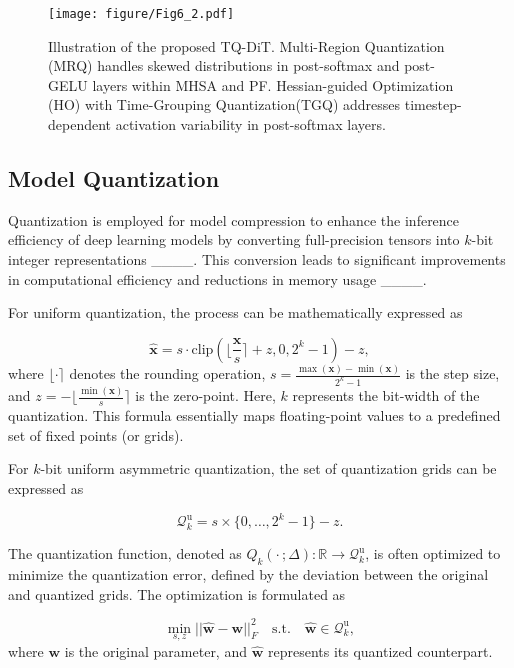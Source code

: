 \begin{figure*}
    \centering
    \texttt{[image: figure/Fig6\_2.pdf]}
    \caption{Illustration of the proposed TQ-DiT. Multi-Region Quantization (MRQ) handles skewed distributions in post-softmax and post-GELU layers within MHSA and PF. Hessian-guided Optimization (HO) with Time-Grouping Quantization(TGQ) addresses timestep-dependent activation variability in post-softmax layers.
    } \label{fig6}
\end{figure*}

\subsection{Model Quantization}
\label{ssec:DiT}

Quantization is employed for model compression to enhance the inference efficiency of deep learning models by converting full-precision tensors into $k$-bit integer representations ____. This conversion leads to significant improvements in computational efficiency and reductions in memory usage ____.

For uniform quantization, the process can be mathematically expressed as

\begin{equation}
\hat{\mathbf{x}} = s \cdot \text{clip} \left( \lfloor\frac{\mathbf{x}}{s} \rceil + z, 0, 2^k-1 \right) - z,
\end{equation}
where $\lfloor \cdot \rceil$ denotes the rounding operation, $s = \frac{\max(\mathbf{x}) - \min(\mathbf{x})}{2^k-1}$ is the step size, and $z = -\lfloor \frac{\min(\mathbf{x})}{s} \rceil$ is the zero-point. Here, $k$ represents the bit-width of the quantization. This formula essentially maps floating-point values to a predefined set of fixed points (or grids).

For $k$-bit uniform asymmetric quantization, the set of quantization grids can be expressed as

\begin{equation}
\mathcal{Q}_k^\text{u} = s \times \{0, \dots, 2^k-1\} - z.
\end{equation}

The quantization function, denoted as $Q_k(\cdot \,;\Delta):\mathbb{R} \to \mathcal{Q}_k^\text{u}$, is often optimized to minimize the quantization error, defined by the deviation between the original and quantized grids. The optimization is formulated as

\begin{equation}
\min_{s, z} ||\hat{\mathbf{w}} - \mathbf{w}||_F^2 \quad \text{s.t.} \quad \hat{\mathbf{w}} \in \mathcal{Q}_k^\text{u},
\end{equation}
where $\mathbf{w}$ is the original parameter, and $\hat{\mathbf{w}}$ represents its quantized counterpart.

